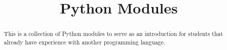\documentclass{xourse}
\title{Python Modules}
\begin{document}
  
\begin{abstract} %
This is a collection of Python modules to serve as an introduction for students that already have experience with another programming language.
\end{abstract}  
\maketitle  
 
\end{document}
